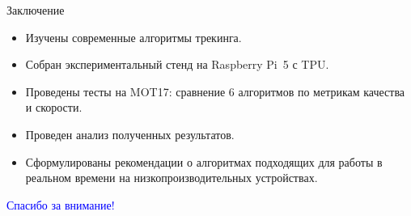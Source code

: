 \documentclass{beamer} %
\begin{document}
\begin{frame}{Заключение}
  \begin{itemize}
    \item Изучены современные алгоритмы трекинга.
    \item Собран экспериментальный стенд на Raspberry Pi 5 с TPU.
    \item Проведены тесты на MOT17: сравнение 6 алгоритмов по метрикам качества и скорости.
    \item Проведен анализ полученных результатов.
    \item Сформулированы рекомендации о алгоритмах подходящих для работы в реальном времени на низкопроизводительных устройствах.
  \end{itemize}
\end{frame}


\begin{frame}
  \centering \Huge \textcolor{blue}{Спасибо за внимание!}
\end{frame}
\end{document}

